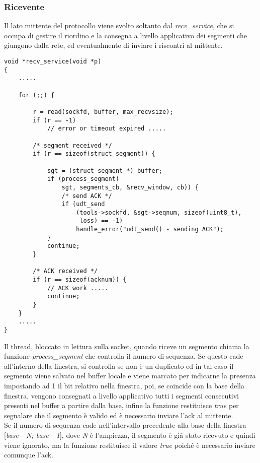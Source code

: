 \subsubsection{Ricevente}
Il lato mittente del protocollo viene svolto soltanto dal 
\emph{recv\_service}, che si occupa di gestire il riordino
e la consegna a livello applicativo dei segmenti che giungono 
dalla rete, ed eventualmente di inviare i riscontri al mittente.
\begin{lstlisting}[title=transport.c]
void *recv_service(void *p)
{
    .....

    for (;;) {

        r = read(sockfd, buffer, max_recvsize);
        if (r == -1) 
            // error or timeout expired .....     

        /* segment received */
        if (r == sizeof(struct segment)) {

            sgt = (struct segment *) buffer;
            if (process_segment(
                sgt, segments_cb, &recv_window, cb)) {
                /* send ACK */
                if (udt_send
                    (tools->sockfd, &sgt->seqnum, sizeof(uint8_t),
                     loss) == -1)
                    handle_error("udt_send() - sending ACK");
            }
            continue;
        }

        /* ACK received */
        if (r == sizeof(acknum)) {
            // ACK work .....
            continue;
        }
    }
    .....
}
\end{lstlisting}
Il thread, bloccato in lettura sulla socket, quando riceve un segmento
chiama la funzione \emph{process\_segment} che controlla il numero di 
sequenza. Se questo cade all'interno della finestra, si controlla se non
è un duplicato ed in tal caso il segmento viene salvato nel buffer locale
e viene marcato per indicarne la presenza impostando ad 1 il bit relativo
nella finestra, poi, se coincide con la base della finestra, vengono 
consegnati a livello applicativo tutti i segmenti
consecutivi presenti nel buffer a partire dalla base, infine la funzione
restituisce \emph{true} per segnalare che il segmento è valido ed 
è necessario inviare l'ack al mittente.\\
Se il numero di sequenza cade nell'intervallo precedente alla base della
finestra [\emph{base - N; base - 1}], dove \emph{N} è l'ampiezza,
il segmento è già stato ricevuto e quindi 
viene ignorato, ma la funzione restituisce il valore \emph{true}
poiché è necessario inviare comunque l'ack.\\
